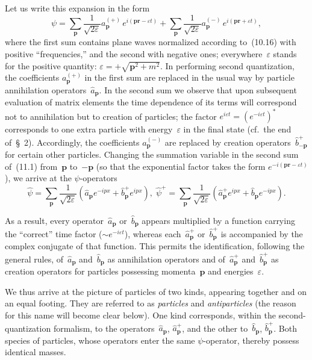 Let us write this expansion in the form
\begin{equation}
\psi = \sum_\mathbf{p} \frac{1}{\sqrt{2\varepsilon}} a^{(+)}_\mathbf{p}\, e^{i(\mathbf{pr} - \varepsilon t)} + \sum_\mathbf{p} \frac{1}{\sqrt{2\varepsilon}} a^{(-)}_\mathbf{p}\, e^{i(\mathbf{pr} + \varepsilon t)},
\tag{11.1}
\end{equation}
where the first sum contains plane waves normalized according to~(10.16) with positive ``frequencies,'' and the second with negative ones; everywhere~$\varepsilon$ stands for the positive quantity: $\varepsilon = +\sqrt{\mathbf{p}^2 + m^2}$. In performing second quantization, the coefficients $a^{(+)}_\mathbf{p}$ in the first sum are replaced in the usual way by particle annihilation operators~$\hat{a}_\mathbf{p}$. In the second sum we observe that upon subsequent evaluation of matrix elements the time dependence of its terms will correspond not to annihilation but to creation of particles; the factor $e^{i\varepsilon t} = (e^{-i\varepsilon t})^*$ corresponds to one extra particle with energy~$\varepsilon$ in the final state (cf.\ the end of~\S~2). Accordingly, the coefficients $a^{(-)}_\mathbf{p}$ are replaced by creation operators~$\hat{b}^+_{-\mathbf{p}}$ for certain other particles. Changing the summation variable in the second sum of~(11.1) from~$\mathbf{p}$ to~$-\mathbf{p}$ (so that the exponential factor takes the form $e^{-i(\mathbf{pr}-\varepsilon t)}$), we arrive at the $\psi$-operators
\begin{equation}
\hat{\psi} = \sum_\mathbf{p} \frac{1}{\sqrt{2\varepsilon}} (\hat{a}_\mathbf{p} e^{-ipx} + \hat{b}^+_\mathbf{p} e^{ipx}),\; \hat{\psi}^+ = \sum_\mathbf{p} \frac{1}{\sqrt{2\varepsilon}} (\hat{a}^+_\mathbf{p} e^{ipx} + \hat{b}_\mathbf{p} e^{-ipx}).
\tag{11.2}
\end{equation}

As a result, every operator~$\hat{a}_\mathbf{p}$ or~$\hat{b}_\mathbf{p}$ appears multiplied by a function carrying the ``correct'' time factor ($\sim e^{-i\varepsilon t}$), whereas each~$\hat{a}^+_\mathbf{p}$ or~$\hat{b}^+_\mathbf{p}$ is accompanied by the complex conjugate of that function. This permits the identification, following the general rules, of~$\hat{a}_\mathbf{p}$ and~$\hat{b}_\mathbf{p}$ as annihilation operators and of~$\hat{a}^+_\mathbf{p}$ and~$\hat{b}^+_\mathbf{p}$ as creation operators for particles possessing momenta~$\mathbf{p}$ and energies~$\varepsilon$.

We thus arrive at the picture of particles of two kinds, appearing together and on an equal footing. They are referred to as \emph{particles} and \emph{antiparticles} (the reason for this name will become clear below). One kind corresponds, within the second-quantization formalism, to the operators~$\hat{a}_\mathbf{p}$, $\hat{a}^+_\mathbf{p}$, and the other to~$\hat{b}_\mathbf{p}$, $\hat{b}^+_\mathbf{p}$. Both species of particles, whose operators enter the same $\psi$-operator, thereby possess identical masses.

